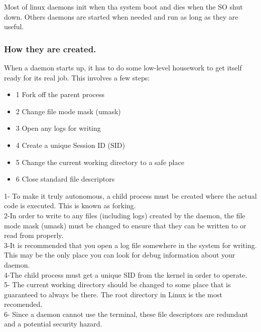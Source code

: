 \documentclass[10pt]{article}
\begin{document}
Most of linux daemons init when tha system boot and dies when the SO shut down. Others daemons are started when needed and run as long as they are useful.

    
\subsubsection{How they are created.}

When a daemon starts up, it has to do some low-level housework to get itself ready for its real job. This involves a few steps:
\begin{itemize}
    \item 1 Fork off the parent process
    \item 2 Change file mode mask (umask)
    \item 3 Open any logs for writing
    \item 4 Create a unique Session ID (SID)
    \item 5 Change the current working directory to a safe place
    \item 6 Close standard file descriptors
\end{itemize}

1- To make it truly autonomous, a child process must be created where the actual code is executed. This is known as forking.\\

2-In order to write to any files (including logs) created by the daemon, the file mode mask (umask) must be changed to ensure that they can be written to or read from properly.\\

3-It is recommended that you open a log file somewhere in the system for writing. This may be the only place you can look for debug information about your daemon.\\

4-The child process must get a unique SID from the kernel in order to operate. \\
    
5- The current working directory should be changed to some place that is guaranteed to always be there. The root directory in Linux is the most recomended.\\

6- Since a daemon cannot use the terminal, these file descriptors are redundant and a potential security hazard.\cite{Watson}\\
\end{document}
